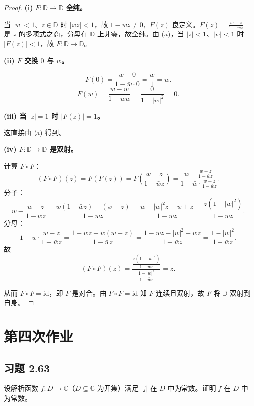 \documentclass[11pt,a4paper]{article}
\newcommand{\C}{\mathbb{C}}
\theoremstyle{definition}
\begin{document}
\begin{proof}
\textbf{(i) $F: \mathbb{D} \to \mathbb{D}$ 全纯。}

当 $|w| < 1$、$z \in \mathbb{D}$ 时 $|wz| < 1$，故 $1 - \bar wz \ne 0$，$F(z)$ 良定义。$F(z) = \frac{w-z}{1-\bar wz}$ 是 $z$ 的多项式之商，分母在 $\mathbb{D}$ 上非零，故全纯。由 (a)，当 $|z| < 1$、$|w| < 1$ 时 $|F(z)| < 1$，故 $F : \mathbb{D} \to \mathbb{D}$。

\textbf{(ii) $F$ 交换 $0$ 与 $w$。}

\[
  F(0) = \frac{w - 0}{1 - \bar w \cdot 0} = \frac{w}{1} = w.
\]
\[
  F(w) = \frac{w - w}{1 - \bar ww} = \frac{0}{1 - |w|^2} = 0.
\]

\textbf{(iii) 当 $|z| = 1$ 时 $|F(z)| = 1$。}

这直接由 (a) 得到。

\textbf{(iv) $F : \mathbb{D} \to \mathbb{D}$ 是双射。}

计算 $F \circ F$：
\[
  (F \circ F)(z) = F(F(z)) = F\left(\frac{w-z}{1-\bar wz}\right)
  = \frac{w - \frac{w-z}{1-\bar wz}}{1 - \bar w \cdot \frac{w-z}{1-\bar wz}}.
\]
分子：
\[
  w - \frac{w-z}{1-\bar wz}
  = \frac{w(1-\bar wz)-(w-z)}{1-\bar wz}
  = \frac{w - |w|^2 z - w + z}{1-\bar wz}
  = \frac{z(1-|w|^2)}{1-\bar wz}.
\]
分母：
\[
  1 - \bar w \cdot \frac{w-z}{1-\bar wz}
  = \frac{1-\bar wz - \bar w(w-z)}{1-\bar wz}
  = \frac{1 - \bar wz - |w|^2 + \bar wz}{1-\bar wz}
  = \frac{1-|w|^2}{1-\bar wz}.
\]
故
\[
  (F \circ F)(z) = \frac{\frac{z(1-|w|^2)}{1-\bar wz}}{\frac{1-|w|^2}{1-\bar wz}} = z.
\]

从而 $F \circ F = \text{id}$，即 $F$ 是对合。由 $F \circ F = \text{id}$ 知 $F$ 连续且双射，故 $F$ 将 $\mathbb{D}$ 双射到自身。
\end{proof}

\section{第四次作业}

\subsection{习题 2.63}

设解析函数 $f : D \to \C$（$D \subseteq \C$ 为开集）满足 $|f|$ 在 $D$ 中为常数。证明 $f$ 在 $D$ 中为常数。
\end{document}
